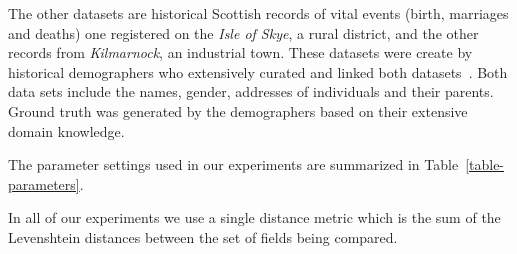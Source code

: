 \documentclass{llncs}
\begin{document}
The other datasets are historical Scottish records of vital
events (birth, marriages and deaths) one registered on the
\emph{Isle of Skye}, a rural district, and the other
records from \emph{Kilmarnock}, an industrial town. These datasets
were create by historical demographers who extensively
curated and linked both datasets~\cite{reid2002,reid2006}. Both data
sets include the  names, gender, addresses of individuals and their
parents. Ground truth was generated by the demographers based on their
extensive domain knowledge.




The parameter settings used in our experiments are summarized in
Table~\ref{table-parameters}.

In all of our experiments we use a single distance metric which is the sum of the Levenshtein distances between the set of fields being compared.
\end{document}
